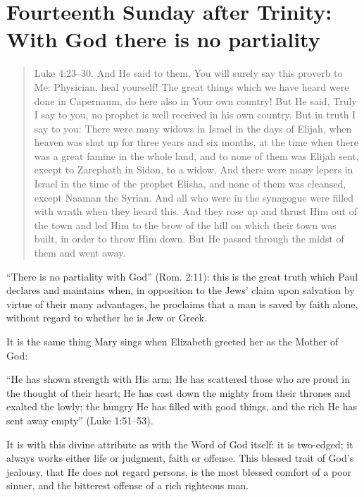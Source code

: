 

\section{Fourteenth Sunday after Trinity: With God there is no partiality}


\begin{quote}

Luke 4:23–30. And He said to them, You will surely say this proverb to Me: Physician, heal yourself! The great things which we have heard were done in Capernaum, do here also in Your own country! But He said, Truly I say to you, no prophet is well received in his own country. But in truth I say to you: There were many widows in Israel in the days of Elijah, when heaven was shut up for three years and six months, at the time when there was a great famine in the whole land, and to none of them was Elijah sent, except to Zarephath in Sidon, to a widow. And there were many lepers in Israel in the time of the prophet Elisha, and none of them was cleansed, except Naaman the Syrian. And all who were in the synagogue were filled with wrath when they heard this. And they rose up and thrust Him out of the town and led Him to the brow of the hill on which their town was built, in order to throw Him down. But He passed through the midst of them and went away.

\end{quote}

\bigskip

“There is no partiality with God” (Rom. 2:11): this is the great truth which Paul declares and maintains when, in opposition to the Jews’ claim upon salvation by virtue of their many advantages, he proclaims that a man is saved by faith alone, without regard to whether he is Jew or Greek.

It is the same thing Mary sings when Elizabeth greeted her as the Mother of God:

“He has shown strength with His arm; He has scattered those who are proud in the thought of their heart; He has cast down the mighty from their thrones and exalted the lowly; the hungry He has filled with good things, and the rich He has sent away empty” (Luke 1:51–53).

It is with this divine attribute as with the Word of God itself: it is two-edged; it always works either life or judgment, faith or offense. This blessed trait of God’s jealousy, that He does not regard persons, is the most blessed comfort of a poor sinner, and the bitterest offense of a rich righteous man.

